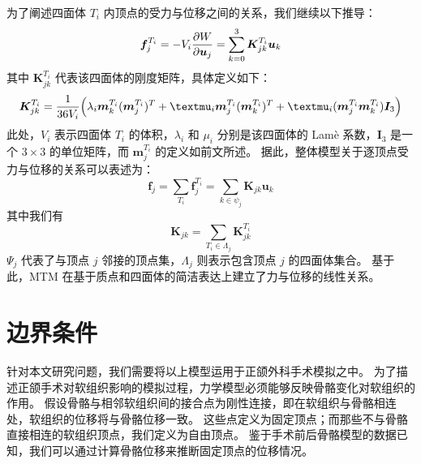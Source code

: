 为了阐述四面体 $T_i$ 内顶点的受力与位移之间的关系，我们继续以下推导：
\begin{equation}
  \bm{f}_j^{T_i}
  = - V_i \pdv{W}{\bm{u}_j}
  = \sum_{k = 0}^3 \bm{K}_{jk}^{T_i} \bm{u}_k
\end{equation}
其中 $\bm{K}_{jk}^{T_i}$ 代表该四面体的刚度矩阵，具体定义如下：
\begin{equation}
  \bm{K}_{jk}^{T_i} = \frac{1}{36 V_i} \pqty{\lambda_i \bm{m}_k^{T_i} (\bm{m}_j^{T_i})^T + \mu_i \bm{m}_j^{T_i} (\bm{m}_k^{T_i})^T + \mu_i (\bm{m}_j^{T_i} \bm{m}_k^{T_i}) \bm{I}_3}
\end{equation}
此处，$V_i$ 表示四面体 $T_i$ 的体积，$\lambda_i$ 和 $\mu_i$ 分别是该四面体的 Lam\`e 系数，$\bm{I}_3$ 是一个 $3 \times 3$ 的单位矩阵，而 $\bm{m}_j^{T_i}$ 的定义如前文所述。
据此，整体模型关于逐顶点受力与位移的关系可以表述为：
\begin{equation}
  \bm{f}_j
  = \sum_{T_i} \bm{f}_j^{T_i}
  = \sum_{k \in \psi_j} \bm{K}_{jk} \bm{u}_k
\end{equation}
其中我们有
\begin{equation}
  \bm{K}_{jk} = \sum_{T_i \in \Lambda_j} \bm{K}_{jk}^{T_i}
\end{equation}
$\Psi_j$ 代表了与顶点 $j$ 邻接的顶点集，$\Lambda_j$ 则表示包含顶点 $j$ 的四面体集合。
基于此，MTM 在基于质点和四面体的简洁表达上建立了力与位移的线性关系。

\section{边界条件}
\label{sec:mtm:boundary}

针对本文研究问题，我们需要将以上模型运用于正颌外科手术模拟之中。
为了描述正颌手术对软组织影响的模拟过程，力学模型必须能够反映骨骼变化对软组织的作用。
假设骨骼与相邻软组织间的接合点为刚性连接，即在软组织与骨骼相连处，软组织的位移将与骨骼位移一致。
这些点定义为固定顶点；而那些不与骨骼直接相连的软组织顶点，我们定义为自由顶点。
鉴于手术前后骨骼模型的数据已知，我们可以通过计算骨骼位移来推断固定顶点的位移情况。

\newpage

